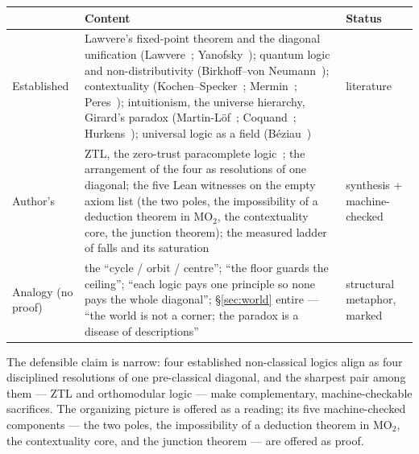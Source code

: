 \documentclass[11pt]{article}
\theoremstyle{remark}
\begin{document}
\begin{center}
\renewcommand{\arraystretch}{1.3}
\begin{tabular}{@{}>{\raggedright}p{2.4cm}p{7.7cm}>{\raggedright\arraybackslash}p{2.3cm}@{}}
\hline
 & \textbf{Content} & \textbf{Status} \\
\hline
Established & Lawvere's fixed-point theorem and the diagonal unification (Lawvere~\cite{lawvere}; Yanofsky~\cite{yanofsky}); quantum logic and non-distributivity (Birkhoff--von Neumann~\cite{bvn}); contextuality (Kochen--Specker~\cite{ks}; Mermin~\cite{mermin}; Peres~\cite{peres}); intuitionism, the universe hierarchy, Girard's paradox (Martin-L\"of~\cite{ml}; Coquand~\cite{coquand}; Hurkens~\cite{hurkens}); universal logic as a field (B\'eziau~\cite{beziau}) & literature \\
Author's & ZTL, the zero-trust paracomplete logic~\cite{ztl}; the arrangement of the four as resolutions of one diagonal; the five Lean witnesses on the empty axiom list (the two poles, the impossibility of a deduction theorem in $\mathrm{MO}_2$, the contextuality core, the junction theorem); the measured ladder of falls and its saturation & synthesis + machine-checked \\
Analogy (no proof) & the ``cycle / orbit / centre''; ``the floor guards the ceiling''; ``each logic pays one principle so none pays the whole diagonal''; \S\ref{sec:world} entire --- ``the world is not a corner; the paradox is a disease of descriptions'' & structural metaphor, marked \\
\hline
\end{tabular}
\end{center}

The defensible claim is narrow: four established non-classical logics align as
four disciplined resolutions of one pre-classical diagonal, and the sharpest
pair among them --- ZTL and orthomodular logic --- make complementary,
machine-checkable sacrifices. The organizing picture is offered as a reading;
its five machine-checked components --- the two poles, the impossibility of
a deduction theorem in $\mathrm{MO}_2$, the contextuality core, and the
junction theorem --- are offered as proof.
\end{document}
